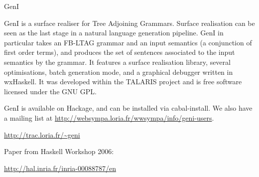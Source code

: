 \begin{hcarentry}[updated]{GenI}
\label{geni}
\makeheader

GenI is a surface realiser for Tree Adjoining Grammars. Surface
realisation can be seen as the last stage in a natural language
generation pipeline. GenI in particular takes an FB-LTAG grammar and an
input semantics (a conjunction of first order terms), and produces the
set of sentences associated to the input semantics by the grammar.  It
features a surface realisation library, several optimisations, batch
generation mode, and a graphical debugger written in wxHaskell.  It was
developed within the TALARIS project and is free software licensed under
the GNU GPL.

GenI is available on Hackage, and can be installed via cabal-install.
We also have a mailing list at
\url{http://websympa.loria.fr/wwsympa/info/geni-users}.

\FurtherReading
\begin{compactitem}
\item \url{http://trac.loria.fr/~geni}
\item Paper from Haskell Workshop 2006:

\url{http://hal.inria.fr/inria-00088787/en}
\end{compactitem}
\end{hcarentry}
